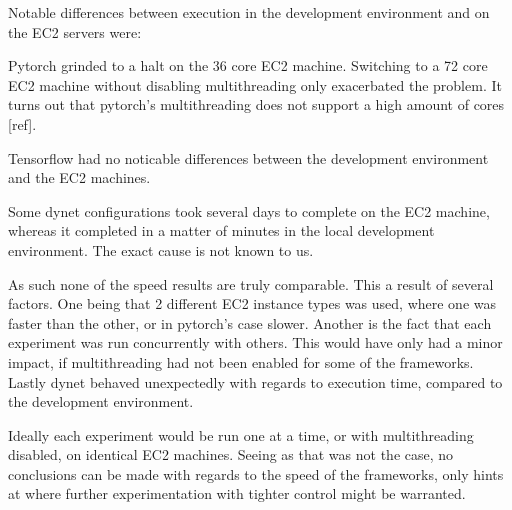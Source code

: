 

Notable differences between execution in the development environment and on the
EC2 servers were:

Pytorch grinded to a halt on the 36 core EC2 machine. Switching to a 72 core EC2
machine without disabling multithreading only exacerbated the problem. It turns
out that pytorch's multithreading does not support a high amount of cores [ref].

Tensorflow had no noticable differences between the development environment and
the EC2 machines.

Some dynet configurations took several days to complete on the EC2 machine,
whereas it completed in a matter of minutes in the local development
environment. The exact cause is not known to us. 


As such none of the speed results are truly comparable. This a result of
several factors.
One being that 2 different EC2 instance types was used, where one was faster
than the other, or in pytorch's case slower.
Another is the fact that each experiment was run concurrently with others. This
would have only had a minor impact, if multithreading had not been enabled for
some of the frameworks.
Lastly dynet behaved unexpectedly with regards to execution time, compared to the
development environment.


Ideally each experiment would be run one at a time, or with multithreading
disabled, on identical EC2 machines. Seeing as that was not the case, no
conclusions can be made with regards to the speed of the frameworks, only hints
at where further experimentation with tighter control might be warranted.
